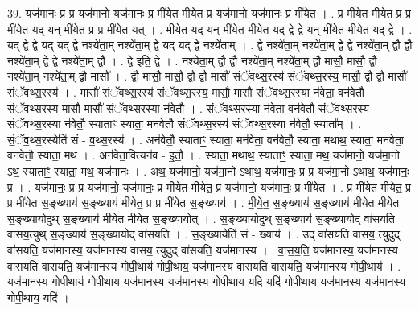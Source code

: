 \documentclass[17pt]{extarticle}
\begin{document}
39. यज॑मानः॒ प्र प्र यज॑मानो॒ यज॑मानः॒ प्र मी॑येत मीयेत॒ प्र यज॑मानो॒ यज॑मानः॒ प्र मी॑येत । . प्र मी॑येत मीयेत॒ प्र प्र मी॑येत॒ यद् यन् मी॑येत॒ प्र प्र मी॑येत॒ यत् । . मी॒ये॒त॒ यद् यन् मी॑येत मीयेत॒ यद् द्वे द्वे यन् मी॑येत मीयेत॒ यद् द्वे । . यद् द्वे द्वे यद् यद् द्वे नश्ये॑ता॒म् नश्ये॑ता॒म् द्वे यद् यद् द्वे नश्ये॑ताम् । . द्वे नश्ये॑ता॒म् नश्ये॑ता॒म् द्वे द्वे नश्ये॑ता॒म् द्वौ द्वौ नश्ये॑ता॒म् द्वे द्वे नश्ये॑ता॒म् द्वौ । . द्वे इति॒ द्वे । . नश्ये॑ता॒म् द्वौ द्वौ नश्ये॑ता॒म् नश्ये॑ता॒म् द्वौ मासौ॒ मासौ॒ द्वौ नश्ये॑ता॒म् नश्ये॑ता॒म् द्वौ मासौ᳚ । . द्वौ मासौ॒ मासौ॒ द्वौ द्वौ मासौ॑ संॅवथ्स॒रस्य॑ संॅवथ्स॒रस्य॒ मासौ॒ द्वौ द्वौ मासौ॑ संॅवथ्स॒रस्य॑ । . मासौ॑ संॅवथ्स॒रस्य॑ संॅवथ्स॒रस्य॒ मासौ॒ मासौ॑ संॅवथ्स॒रस्या न॑वेता॒ वन॑वेतौ संॅवथ्स॒रस्य॒ मासौ॒ मासौ॑ संॅवथ्स॒रस्या न॑वेतौ । . सं॒ॅव॒थ्स॒रस्या न॑वेता॒ वन॑वेतौ संॅवथ्स॒रस्य॑ संॅवथ्स॒रस्या न॑वेतौ॒ स्याताꣳ॒॒ स्याता॒ मन॑वेतौ संॅवथ्स॒रस्य॑ संॅवथ्स॒रस्या न॑वेतौ॒ स्याता᳚म् । . सं॒ॅव॒थ्स॒रस्येति॑ सं - व॒थ्स॒रस्य॑ । . अन॑वेतौ॒ स्याताꣳ॒॒ स्याता॒ मन॑वेता॒ वन॑वेतौ॒ स्याता॒ मथाथ॒ स्याता॒ मन॑वेता॒ वन॑वेतौ॒ स्याता॒ मथ॑ । . अन॑वेता॒वित्यन॑व - इ॒तौ॒ । . स्याता॒ मथाथ॒ स्याताꣳ॒॒ स्याता॒ मथ॒ यज॑मानो॒ यज॑मा॒नो ऽथ॒ स्याताꣳ॒॒ स्याता॒ मथ॒ यज॑मानः । . अथ॒ यज॑मानो॒ यज॑मा॒नो ऽथाथ॒ यज॑मानः॒ प्र प्र यज॑मा॒नो ऽथाथ॒ यज॑मानः॒ प्र । . यज॑मानः॒ प्र प्र यज॑मानो॒ यज॑मानः॒ प्र मी॑येत मीयेत॒ प्र यज॑मानो॒ यज॑मानः॒ प्र मी॑येत । . प्र मी॑येत मीयेत॒ प्र प्र मी॑येत स॒ङ्ख्याय॑ स॒ङ्ख्याय॑ मीयेत॒ प्र प्र मी॑येत स॒ङ्ख्याय॑ । . मी॒ये॒त॒ स॒ङ्ख्याय॑ स॒ङ्ख्याय॑ मीयेत मीयेत स॒ङ्ख्यायोदुथ् स॒ङ्ख्याय॑ मीयेत मीयेत स॒ङ्ख्यायोत् । . स॒ङ्ख्यायोदुथ् स॒ङ्ख्याय॑ स॒ङ्ख्यायोद् वा॑सयति वासय॒त्युथ् स॒ङ्ख्याय॑ स॒ङ्ख्यायोद् वा॑सयति । . स॒ङ्ख्यायेति॑ सं - ख्याय॑ । . उद् वा॑सयति वासय॒ त्युदुद् वा॑सयति॒ यज॑मानस्य॒ यज॑मानस्य वासय॒ त्युदुद् वा॑सयति॒ यज॑मानस्य । . वा॒स॒य॒ति॒ यज॑मानस्य॒ यज॑मानस्य वासयति वासयति॒ यज॑मानस्य गोपी॒थाय॑ गोपी॒थाय॒ यज॑मानस्य वासयति वासयति॒ यज॑मानस्य गोपी॒थाय॑ । . यज॑मानस्य गोपी॒थाय॑ गोपी॒थाय॒ यज॑मानस्य॒ यज॑मानस्य गोपी॒थाय॒ यदि॒ यदि॑ गोपी॒थाय॒ यज॑मानस्य॒ यज॑मानस्य गोपी॒थाय॒ यदि॑ । \newline
\pagebreak
{}
\end{document}
